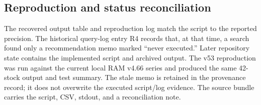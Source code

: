 

\subsection{Reproduction and status reconciliation}

The recovered output table and reproduction log match the script to the reported precision. The historical query-log entry R4 records that, at that time, a search found only a recommendation memo marked ``never executed.'' Later repository state contains the implemented script and archived output. The v53 reproduction was run against the current local RAM v4.66 series and produced the same 42-stock output and test summary. The stale memo is retained in the provenance record; it does not overwrite the executed script/log evidence. The source bundle carries the script, CSV, stdout, and a reconciliation note.

